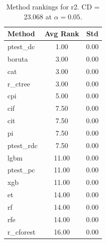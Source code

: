 \begin{table}[h]
\centering
\caption{Method rankings for r2. CD = 23.068 at $\alpha=0.05$.}
\label{tab:ranks_r2}
\begin{tabular}{lcc}
\toprule
Method & Avg Rank & Std \\
\midrule
ptest_dc & 1.00 & 0.00 \\
boruta & 3.00 & 0.00 \\
cat & 3.00 & 0.00 \\
r_ctree & 3.00 & 0.00 \\
cpi & 5.00 & 0.00 \\
cif & 7.50 & 0.00 \\
cit & 7.50 & 0.00 \\
pi & 7.50 & 0.00 \\
ptest_rdc & 7.50 & 0.00 \\
lgbm & 11.00 & 0.00 \\
ptest_pc & 11.00 & 0.00 \\
xgb & 11.00 & 0.00 \\
et & 14.00 & 0.00 \\
rf & 14.00 & 0.00 \\
rfe & 14.00 & 0.00 \\
r_cforest & 16.00 & 0.00 \\
\bottomrule
\end{tabular}
\end{table}